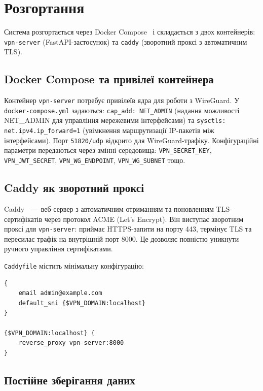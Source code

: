 \section{Розгортання}
\label{sec:ch3_deployment}

Система розгортається через Docker Compose~\cite{docker2024} і складається
з двох контейнерів: \texttt{vpn-server} (FastAPI-застосунок) та
\texttt{caddy} (зворотний проксі з автоматичним TLS).

\subsection{Docker Compose та привілеї контейнера}

Контейнер \texttt{vpn-server} потребує привілеїв ядра для роботи з
WireGuard. У \texttt{docker-compose.yml} задаються:
\texttt{cap\_add: NET\_ADMIN} (надання можливості NET\_ADMIN для управління
мережевими інтерфейсами) та \texttt{sysctls: net.ipv4.ip\_forward=1}
(увімкнення маршрутизації IP-пакетів між інтерфейсами). Порт \texttt{51820/udp}
відкрито для WireGuard-трафіку. Конфігураційні параметри передаються
через змінні середовища: \texttt{VPN\_SECRET\_KEY}, \texttt{VPN\_JWT\_SECRET},
\texttt{VPN\_WG\_ENDPOINT}, \texttt{VPN\_WG\_SUBNET} тощо.

\subsection{Caddy як зворотний проксі}

Caddy~\cite{caddy2024}~--- веб-сервер з автоматичним отриманням та
поновленням TLS-сертифікатів через протокол ACME (Let's Encrypt).
Він виступає зворотним проксі для \texttt{vpn-server}: приймає HTTPS-запити
на порту 443, термінує TLS та пересилає трафік на внутрішній порт 8000.
Це дозволяє повністю уникнути ручного управління сертифікатами.

\texttt{Caddyfile} містить мінімальну конфігурацію:
\begin{lstlisting}[style=mystyle,
  caption={Конфігурація Caddy як зворотного проксі},
  label={lst:caddyfile}]
{
    email admin@example.com
    default_sni {$VPN_DOMAIN:localhost}
}

{$VPN_DOMAIN:localhost} {
    reverse_proxy vpn-server:8000
}
\end{lstlisting}

\subsection{Постійне зберігання даних}

